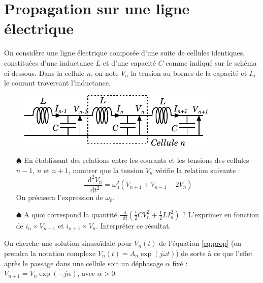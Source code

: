 \documentclass{report}
\newcommand*\dif{\mathop{}\!\mathrm{d}}
\begin{document}
\section*{Propagation sur une ligne électrique}

On considère une ligne électrique composée d'une suite de cellules identiques, constituées d'une inductance $L$ et d'une capacité $C$ comme indiqué sur le schéma ci-dessous. Dans la cellule $n$, on note $V_n$ la tension au bornes de la capacité et $I_n$ le courant traversant  l'inductance.

\begin{figure}[h!]
\centering
	\includegraphics[scale=1.5]{onde3.pdf}
\end{figure}

\begin{itemize}

	\item[$\spadesuit$] En établissant des relations entre les courants et les tensions des cellules $n-1$, $n$ et $n+1$, montrer que la tension $V_n$ vérifie la relation suivante :
	\begin{equation}
		\frac{\dif^2 V_n}{\dif t^2} =\omega_0^2(V_{n+1}+V_{n-1}-2V_n)
		\label{eq:prop}
	\end{equation}
	On précisera l'expression de $\omega_0$.
	
	 \item[$\spadesuit$] A quoi correspond la quantité $\frac{\dif}{\dif t}\left( \frac{1}{2}CV_n^2 + \frac{1}{2}LI_n^2 \right)$ ? L'exprimer en fonction de $i_n\times V_{n-1}$ et $i_{n+1}\times V_{n}$. Interpréter ce résultat.

\end{itemize}

On cherche une solution sinusoïdale pour $V_n(t)$ de l'équation \ref{eq:prop} (on prendra la notation complexe $V_n(t)=A_n\exp(j\omega t)$) de sorte à ce que l'effet après le passage dans une cellule soit un déphasage $\alpha$ fixé : $V_{n+1}=V_n\exp(-j\alpha)$, avec $\alpha>0$.
\end{document}
